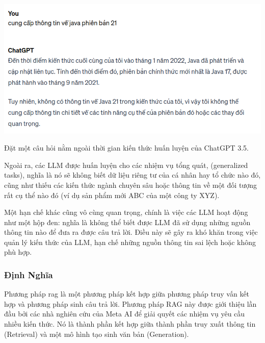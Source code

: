 \documentclass[a4paper, 12pt, openany]{book}
\begin{document}
\begin{minipage}{\linewidth}
    \centering
    \includegraphics[width=14cm]{./assets/images/llm-limitation-1.png}
    \captionsetup{type=figure}
    \caption{Đặt một câu hỏi nằm ngoài thời gian kiến thức huấn luyện của ChatGPT 3.5.}
\end{minipage}

\vspace{0.2cm}

Ngoài ra, các LLM được huấn luyện cho các nhiệm vụ tổng quát, (generalized tasks), nghĩa là nó sẽ không biết dữ liệu riêng tư của cá nhân hay tổ chức nào đó, 
cũng như thiếu các kiến thức ngành chuyên sâu hoặc thông tin về một đối tượng rất cụ thể nào đó (ví dụ sản phẩm mới ABC của một công ty XYZ). 

Một hạn chế khác cũng vô cùng quan trọng, chính là việc các LLM hoạt động như một hộp đen: 
nghĩa là không thể biết được LLM đã sử dụng những nguồn thông tin nào để đưa ra được câu trả lời. Điều này sẽ gây ra
khó khăn trong việc quản lý kiến thức của LLM, hạn chế những nguồn thông tin sai lệch hoặc không phù hợp.


\subsubsection{Định Nghĩa}
Phương pháp \ac{rag} là một phương pháp kết hợp giữa phương pháp truy vấn kết hợp và phương pháp sinh câu trả lời.
Phương pháp RAG \cite{lewis2021retrievalaugmented} này được giới thiệu lần đầu bởi các nhà nghiên cứu của Meta AI để giải quyết các nhiệm vụ yêu cầu nhiều kiến thức.
Nó là thành phần kết hợp giữa thành phần truy xuất thông tin (Retrieval) và một mô hình tạo sinh văn bản (Generation).
\end{document}
